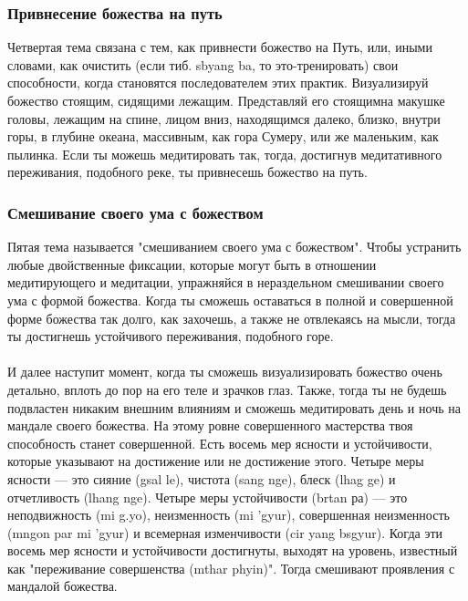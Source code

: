 \subsubsection{Привнесение божества на путь}

Четвертая тема связана с тем, как привнести божество на Путь, или, иными словами,
как очистить (если тиб. sbyang ba, то это-тренировать) свои способности, когда
становятся последователем этих практик. Визуализируй божество стоящим, сидящими
лежащим. Представляй его стоящимна макушке головы, лежащим на спине, лицом вниз,
находящимся далеко, близко, внутри горы, в глубине океана, массивным, как гора Сумеру,
или же маленьким, как пылинка. Если ты можешь медитировать так, тогда, достигнув
медитативного переживания, подобного реке, ты привнесешь божество на путь.

\subsubsection{Смешивание своего ума с божеством}

Пятая тема называется "смешиванием своего ума с божеством". Чтобы устранить
любые двойственные фиксации, которые могут быть в отношении медитирующего и
медитации, упраж\-няйся в нераздельном смешивании своего ума с формой божества. Когда
ты сможешь оставаться в полной и совершен\-ной форме божества так долго, как захочешь, а
также не отвлекаясь на мысли, тогда ты достигнешь устойчивого переживания, подобного
горе.\\
\\
И далее наступит момент, когда ты сможешь визуализировать божество очень
детально, вплоть до пор на его теле и зрачков глаз. Также, тогда ты не будешь подвластен
никаким внешним влияниям и сможешь медитировать день и ночь на мандале своего
божества. На этому ровне совершенного мастерства твоя способность станет совершенной.
Есть восемь мер ясности и устойчивости, которые указывают на достижение или не
достижение этого. Четыре меры ясности — это сияние (gsal le), чистота (sang nge), блеск (lhag
ge) и отчетливость (lhang nge). Четыре меры устойчивости (brtan ра) — это неподвижность (mi
g.yo), неизменность (mi 'gyur), совершенная неизменность (mngon par mi 'gyur) и всемерная
изменчивости (cir yang bsgyur). Когда эти восемь мер ясности и устойчивости достигнуты,
выходят на уровень, известный как "переживание совершенства (mthar phyin)". Тогда
смешивают проявления с мандалой божества.\\

